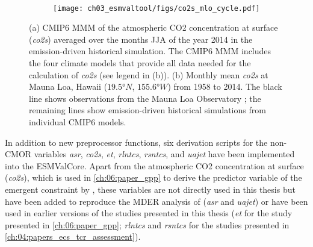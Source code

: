 \begin{figure}[t]
  \centering
  \begin{subfigure}[b]{\SubfigureWidth{}}
    \caption{}
    \label{fig:03:co2s:a}
  \end{subfigure}
  ~
  \begin{subfigure}[b]{\SubfigureWidth{}}
    \texttt{[image: 
      ch03\_esmvaltool/figs/co2s\_mlo\_cycle.pdf]}
    \caption{}
    \label{fig:03:co2s:b}
  \end{subfigure}
  \caption[
    Illustration of the atmospheric \acs{CO2} concentration at surface
    (\emph{co2}) for \acs{CMIP}6 models.
  ]{
    (a) \acs{CMIP}6 \acf{MMM} of the atmospheric \acs{CO2} concentration at
    surface (\emph{co2s}) averaged over the months \acf{JJA} of the year 2014
    in the emission-driven historical simulation. The \acs{CMIP}6 \acs{MMM}
    includes the four climate models that provide all data needed for the
    calculation of \emph{co2s} (see legend in (b)). (b) Monthly mean
    \emph{co2s} at Mauna Loa, Hawaii ($19.5 \unit{\degree N}$, $155.6
    \unit{\degree W}$) from 1958 to 2014. The black line shows observations
    from the Mauna Loa Observatory \autocite{Keeling2005}; the remaining lines
    show emission-driven historical simulations from individual \acs{CMIP}6
    models.
  }
  \label{fig:03:co2s}
\end{figure}

In addition to new preprocessor functions, six derivation scripts for the
non-\ac{CMOR} variables \emph{asr}, \emph{co2s}, \emph{et}, \emph{rlntcs},
\emph{rsntcs}, and \emph{uajet} have been implemented into the \ac{ESMValCore}.
Apart from the atmospheric \ac{CO2} concentration at surface (\emph{co2s}),
which is used in \cref{ch:06:paper_gpp} to derive the predictor variable of the
emergent constraint by \textcite{Wenzel2016}, these variables are not directly
used in this thesis but have been added to reproduce the \ac{MDER} analysis of
\textcite{Wenzel2016a} (\emph{asr} and \emph{uajet}) or have been used in
earlier versions of the studies presented in this thesis (\emph{et} for the
study presented in \cref{ch:06:paper_gpp}; \emph{rlntcs} and \emph{rsntcs} for
the studies presented in \cref{ch:04:papers_ecs_tcr_assessment}).

